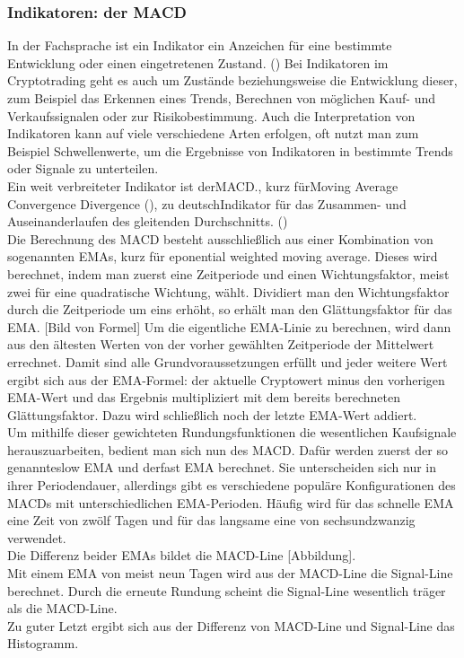 \documentclass[12pt]{article}
\begin{document}
	\subsubsection{Indikatoren: der MACD}
		In der Fachsprache ist ein Indikator ein Anzeichen für eine bestimmte Entwicklung oder einen eingetretenen Zustand. (\cite{OxfordLanguageIndicator}) Bei Indikatoren im Cryptotrading geht es auch um Zustände beziehungsweise die Entwicklung dieser, zum Beispiel das Erkennen eines Trends, Berechnen von möglichen Kauf- und Verkaufssignalen oder zur Risikobestimmung. Auch die Interpretation von Indikatoren kann auf viele verschiedene Arten erfolgen, oft nutzt man zum Beispiel Schwellenwerte, um die Ergebnisse von Indikatoren in bestimmte Trends oder Signale zu unterteilen.\\
		Ein weit verbreiteter Indikator ist der\glqq MACD.\grqq{}, kurz für\glqq Moving Average Convergence Divergence\grqq{} (\cite{investopediaMACD}), zu deutsch\glqq Indikator für das Zusammen- und Auseinanderlaufen des gleitenden Durchschnitts.\grqq{} (\cite{wikipediaMACDDeutsch})\\ Die Berechnung des MACD besteht ausschließlich aus einer Kombination von sogenannten \glqq EMAs\grqq{}, kurz für \glqq eponential weighted moving average\grqq{}. Dieses wird berechnet, indem man zuerst eine Zeitperiode und einen Wichtungsfaktor, meist zwei für eine quadratische Wichtung, wählt. Dividiert man den Wichtungsfaktor durch die Zeitperiode um eins erhöht, so erhält man den Glättungsfaktor für das EMA. [Bild von Formel] Um die eigentliche EMA-Linie zu berechnen, wird dann aus den ältesten Werten von der vorher gewählten Zeitperiode der Mittelwert errechnet. Damit sind alle Grundvoraussetzungen erfüllt und jeder weitere Wert ergibt sich aus der EMA-Formel: der aktuelle Cryptowert minus den vorherigen EMA-Wert und das Ergebnis multipliziert mit dem bereits berechneten Glättungsfaktor. Dazu wird schließlich noch der letzte EMA-Wert addiert.\\
		Um mithilfe dieser gewichteten Rundungsfunktionen die wesentlichen Kaufsignale herauszuarbeiten, bedient man sich nun des MACD. Dafür werden zuerst der so genannte\glqq slow EMA\grqq{} und der\glqq fast EMA\grqq{} berechnet. Sie unterscheiden sich nur in ihrer Periodendauer, allerdings gibt es verschiedene populäre Konfigurationen des MACDs mit unterschiedlichen EMA-Perioden. Häufig wird für das schnelle EMA eine Zeit von zwölf Tagen und für das langsame eine von sechsundzwanzig verwendet.\\
		Die Differenz beider EMAs bildet die MACD-Line [Abbildung].\\
		Mit einem EMA von meist neun Tagen wird aus der MACD-Line die Signal-Line berechnet. Durch die erneute Rundung scheint die Signal-Line wesentlich träger als die MACD-Line.\\
		Zu guter Letzt ergibt sich aus der Differenz von MACD-Line und Signal-Line das Histogramm.
\end{document}
